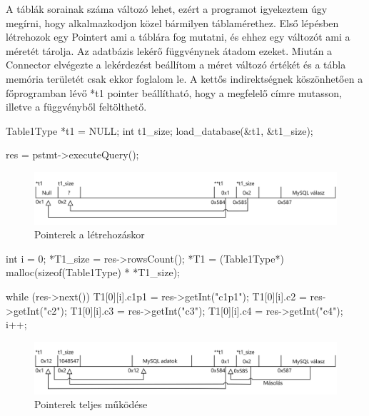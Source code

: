 \newpage
{}

A táblák sorainak száma változó lehet, ezért a programot igyekeztem úgy megírni, hogy alkalmazkodjon közel bármilyen táblamérethez.
Első lépésben létrehozok egy Pointert ami a táblára fog mutatni, és ehhez egy változót ami a méretét tárolja. Az adatbázis lekérő függvénynek átadom ezeket.
Miután a Connector elvégezte a lekérdezést beállítom a méret változó értékét és a tábla memória területét csak ekkor foglalom le. A kettős indirektségnek köszönhetően a főprogramban lévő *t1 pointer beállítható, hogy a megfelelő címre mutasson, illetve a függvényből feltölthető.
\begin{cpp}
Table1Type *t1 = NULL;
int t1_size;
load_database(&t1, &t1_size);
	
res = pstmt->executeQuery();
\end{cpp}
\begin{figure}[h!]
\centering
\includegraphics[width=\textwidth]{images/implementation/pointer_01.png}
\caption{Pointerek a létrehozáskor}
\label{fig:opencl}
\end{figure}

\begin{cpp}
int i = 0;
*T1_size = res->rowsCount();
*T1 = (Table1Type*) malloc(sizeof(Table1Type) * *T1_size);

while (res->next())
{
	T1[0][i].c1p1 = res->getInt("c1p1");
	T1[0][i].c2 = res->getInt("c2");
	T1[0][i].c3 = res->getInt("c3");
	T1[0][i].c4 = res->getInt("c4");
	i++;
}
\end{cpp}

\begin{figure}[h!]
\centering
\includegraphics[width=\textwidth]{images/implementation/pointer_02.png}
\caption{Pointerek teljes működése}
\label{fig:opencl}
\end{figure}

